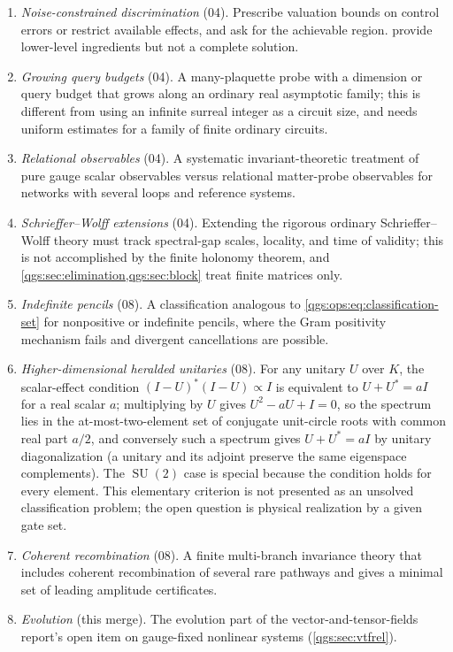 \documentclass[11pt,oneside]{article}
\numberwithin{equation}{section}
\theoremstyle{plain}
\theoremstyle{definition}
\theoremstyle{remark}
\DeclareMathOperator{\SU}{SU}
\begin{document}
\begin{enumerate}
\item \emph{Noise-constrained discrimination} (04). Prescribe valuation bounds on control errors or restrict available effects, and ask for the achievable region.  provide lower-level ingredients but not a complete solution.
\item \emph{Growing query budgets} (04). A many-plaquette probe with a dimension or query budget that grows along an ordinary real asymptotic family; this is different from using an infinite surreal integer as a circuit size, and needs uniform estimates for a family of finite ordinary circuits.
\item \emph{Relational observables} (04). A systematic invariant-theoretic treatment of pure gauge scalar observables versus relational matter-probe observables for networks with several loops and reference systems.
\item \emph{Schrieffer--Wolff extensions} (04). Extending the rigorous ordinary Schrieffer--Wolff theory must track spectral-gap scales, locality, and time of validity; this is not accomplished by the finite holonomy theorem, and \cref{qgs:sec:elimination,qgs:sec:block} treat finite matrices only.
\item \emph{Indefinite pencils} (08). A classification analogous to \eqref{qgs:ops:eq:classification-set} for nonpositive or indefinite pencils, where the Gram positivity mechanism fails and divergent cancellations are possible.
\item \emph{Higher-dimensional heralded unitaries} (08). For any unitary $U$ over $K$, the scalar-effect condition $(I-U)^*(I-U)\propto I$ is equivalent to $U+U^*=aI$ for a real scalar $a$; multiplying by $U$ gives $U^2-aU+I=0$, so the spectrum lies in the at-most-two-element set of conjugate unit-circle roots with common real part $a/2$, and conversely such a spectrum gives $U+U^*=aI$ by unitary diagonalization (a unitary and its adjoint preserve the same eigenspace complements). The $\SU(2)$ case is special because the condition holds for every element. This elementary criterion is not presented as an unsolved classification problem; the open question is physical realization by a given gate set.
\item \emph{Coherent recombination} (08). A finite multi-branch invariance theory that includes coherent recombination of several rare pathways and gives a minimal set of leading amplitude certificates.
\item \emph{Evolution} (this merge). The evolution part of the vector-and-tensor-fields report's open item on gauge-fixed nonlinear systems (\cref{qgs:sec:vtfrel}).
\end{enumerate}
\end{document}
